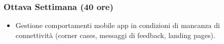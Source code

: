 {    \subsubsection{Ottava Settimana (40 ore)}
    	 \begin{itemize}
    		\item Gestione comportamenti mobile app in condizioni di mancanza di connettività (corner cases, messaggi di feedback, landing pages).
    	\end{itemize}
        
}

\newcommand{\totaleOre}{}

\newcommand{\obiettiviObbligatori}{
	 \item \textbf{OB-1}: competenza nello sviluppo delle singole attività identificate con i linguaggi PHP, Typescript.
}

\newcommand{\obiettiviDesiderabili}{
	 \item \textbf{OD-1}: capacità autonoma di analisi delle singole attività delle soluzioni tecniche viste durante il progetto;
	 \item \textbf{OD-2}: capacità autonoma di progettazione delle singole attività delle soluzioni tecniche viste durante il progetto.
}

